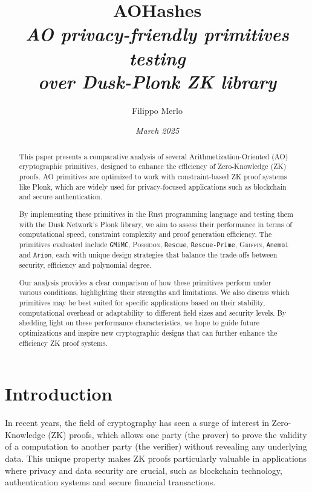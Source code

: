 \documentclass[12pt, a4paper]{report}
\title{{\textbf{AOHashes}}\\[20pt]\textsl{AO privacy-friendly primitives testing\\over Dusk-\textsf{Plonk} ZK library}}
\author{\Large{Filippo Merlo}}
\date{\textit{March 2025}}
\begin{document}
\maketitle
\newpage
{}
\tableofcontents
\pagebreak

\begin{abstract}
This paper presents a comparative analysis of several Arithmetization-Oriented (AO) cryptographic primitives, designed to enhance the efficiency of Zero-Knowledge (ZK) proofs.
AO primitives are optimized to work with constraint-based ZK proof systems like \textsf{Plonk}, which are widely used for privacy-focused applications such as blockchain and secure authentication.

By implementing these primitives in the Rust programming language and testing them with the Dusk Network’s \textsf{Plonk} library, we aim to assess their performance in terms of computational speed, constraint complexity and proof generation efficiency.
The primitives evaluated include \texttt{GMiMC}, \textsc{Poseidon}, \texttt{Rescue}, \texttt{Rescue-Prime}, \textsc{Griffin}, \texttt{Anemoi} and \texttt{Arion}, each with unique design strategies that balance the trade-offs between security, efficiency and polynomial degree.

Our analysis provides a clear comparison of how these primitives perform under various conditions, highlighting their strengths and limitations.
We also discuss which primitives may be best suited for specific applications based on their stability, computational overhead or adaptability to different field sizes and security levels.
By shedding light on these performance characteristics, we hope to guide future optimizations and inspire new cryptographic designs that can further enhance the efficiency ZK proof systems.
\end{abstract}

\chapter{Introduction}\label{chap:intro}

In recent years, the field of cryptography has seen a surge of interest in Zero-Knowledge (ZK) proofs, which allows one party (the prover) to prove the validity of a computation to another party (the verifier) without revealing any underlying data.
This unique property makes ZK proofs particularly valuable in applications where privacy and data security are crucial, such as blockchain technology, authentication systems and secure financial transactions.
\end{document}
